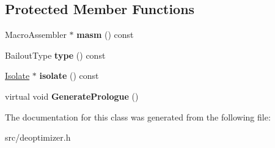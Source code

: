\subsection*{Protected Member Functions}
\begin{DoxyCompactItemize}
\item 
\hypertarget{classv8_1_1internal_1_1_deoptimizer_1_1_b_a_s_e___e_m_b_e_d_d_e_d_ae11d3fa7d6c126b35985e6da88818b4a}{}Macro\+Assembler $\ast$ {\bfseries masm} () const \label{classv8_1_1internal_1_1_deoptimizer_1_1_b_a_s_e___e_m_b_e_d_d_e_d_ae11d3fa7d6c126b35985e6da88818b4a}

\item 
\hypertarget{classv8_1_1internal_1_1_deoptimizer_1_1_b_a_s_e___e_m_b_e_d_d_e_d_a1ee53b32318046535c5d383eb719001e}{}Bailout\+Type {\bfseries type} () const \label{classv8_1_1internal_1_1_deoptimizer_1_1_b_a_s_e___e_m_b_e_d_d_e_d_a1ee53b32318046535c5d383eb719001e}

\item 
\hypertarget{classv8_1_1internal_1_1_deoptimizer_1_1_b_a_s_e___e_m_b_e_d_d_e_d_a2e1b1ebd94291e1b8d890a3079a79dc3}{}\hyperlink{classv8_1_1internal_1_1_isolate}{Isolate} $\ast$ {\bfseries isolate} () const \label{classv8_1_1internal_1_1_deoptimizer_1_1_b_a_s_e___e_m_b_e_d_d_e_d_a2e1b1ebd94291e1b8d890a3079a79dc3}

\item 
\hypertarget{classv8_1_1internal_1_1_deoptimizer_1_1_b_a_s_e___e_m_b_e_d_d_e_d_ad94d456560c0c35abc036ca2785f4e43}{}virtual void {\bfseries Generate\+Prologue} ()\label{classv8_1_1internal_1_1_deoptimizer_1_1_b_a_s_e___e_m_b_e_d_d_e_d_ad94d456560c0c35abc036ca2785f4e43}

\end{DoxyCompactItemize}


The documentation for this class was generated from the following file\+:\begin{DoxyCompactItemize}
\item 
src/deoptimizer.\+h\end{DoxyCompactItemize}
